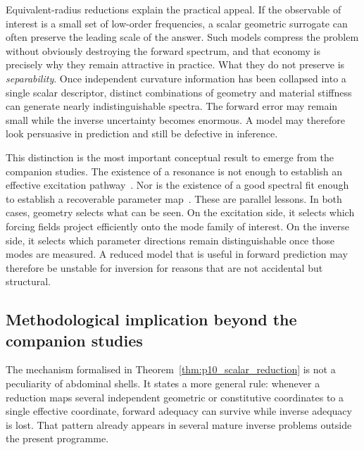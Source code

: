 Equivalent-radius reductions explain the practical appeal.  If the observable of
interest is a small set of low-order frequencies, a scalar geometric surrogate
can often preserve the leading scale of the answer.  Such models compress the
problem without obviously destroying the forward spectrum, and that economy is
precisely why they remain attractive in practice.  What they do not preserve is
\emph{separability}.  Once independent curvature information has been collapsed
into a single scalar descriptor, distinct combinations of geometry and material
stiffness can generate nearly indistinguishable spectra.  The forward error may
remain small while the inverse uncertainty becomes enormous.  A model may
therefore look persuasive in prediction and still be defective in inference.

This distinction is the most important conceptual result to emerge from the
companion studies.  The existence of a resonance is not enough to establish an
effective excitation pathway~\cite{BrowntoneP1,BrowntoneP6}.  Nor is the
existence of a good spectral fit enough to establish a recoverable parameter
map~\cite{BrowntoneP7,BrowntoneP8}.
These are parallel lessons.  In both cases, geometry selects what can be seen.
On the excitation side, it selects which forcing fields project efficiently onto
the mode family of interest.  On the inverse side, it selects which parameter
directions remain distinguishable once those modes are measured.  A reduced
model that is useful in forward prediction may therefore be unstable for inversion for reasons that
are not accidental but structural.


\subsection{Methodological implication beyond the companion studies}

The mechanism formalised in Theorem~\ref{thm:p10_scalar_reduction} is not a peculiarity of abdominal
shells.  It states a more general rule: whenever a reduction maps several
independent geometric or constitutive coordinates to a single effective
coordinate, forward adequacy can survive while inverse adequacy is lost.  That
pattern already appears in several mature inverse problems outside the present
programme.

